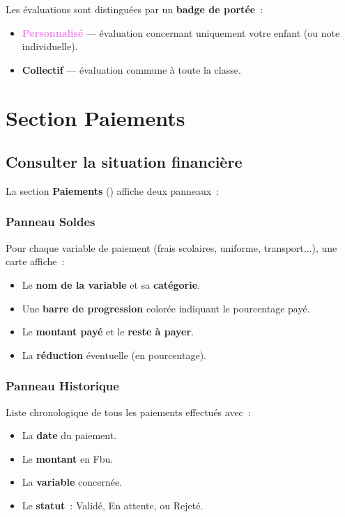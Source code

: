 \begin{astuce}
Les \'evaluations sont distingu\'ees par un \textbf{badge de port\'ee}~:
\begin{itemize}
  \item \textcolor{violet}{\textbf{Personnalis\'e}} --- \'evaluation concernant uniquement votre enfant (ou note individuelle).
  \item \textcolor{sky}{\textbf{Collectif}} --- \'evaluation commune \`a toute la classe.
\end{itemize}
\end{astuce}

\newpage
\chapter{Section Paiements}

\section{Consulter la situation financi\`ere}

La section \textbf{Paiements} (\faCreditCard) affiche deux panneaux~:

\subsection{Panneau Soldes}

Pour chaque variable de paiement (frais scolaires, uniforme, transport...), une carte affiche~:
\begin{itemize}
  \item Le \textbf{nom de la variable} et sa \textbf{cat\'egorie}.
  \item Une \textbf{barre de progression} color\'ee indiquant le pourcentage pay\'e.
  \item Le \textbf{montant pay\'e} et le \textbf{reste \`a payer}.
  \item La \textbf{r\'eduction} \'eventuelle (en pourcentage).
\end{itemize}

\subsection{Panneau Historique}

Liste chronologique de tous les paiements effectu\'es avec~:
\begin{itemize}
  \item La \textbf{date} du paiement.
  \item Le \textbf{montant} en Fbu.
  \item La \textbf{variable} concern\'ee.
  \item Le \textbf{statut}~: \textcolor{emerald}{Valid\'e}, \textcolor{amber}{En attente}, ou \textcolor{rose}{Rejet\'e}.
\end{itemize}

